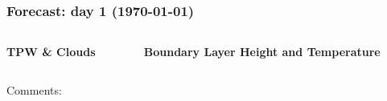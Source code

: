 \documentclass[aspectratio=169, 10pt]{beamer}
\begin{document}
\begin{frame}
\frametitle{Forecast: day 1 ({\AdvanceDate[+1]\today})}

\vspace{-.3cm}
\begin{columns}
\begin{column}{0.5\textwidth}
\begin{center}
\textbf{TPW \& Clouds}\\
\end{center}
\end{column}

\begin{column}{0.5\textwidth}
\begin{center}
\textbf{Boundary Layer Height and Temperature} \\
\end{center}
\end{column}
\end{columns}

\begin{figure}

\end{figure}

Comments:
\vspace{4cm}


\end{frame}
\end{document}
